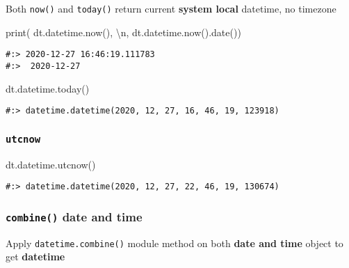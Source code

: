 \documentclass[
]{book}
\newenvironment{Shaded}{\begin{snugshade}}{\end{snugshade}}
\newcommand{\BuiltInTok}[1]{#1}
\newcommand{\CharTok}[1]{\textcolor[rgb]{0.5,0.5,0.5}{#1}}
\newcommand{\NormalTok}[1]{#1}
\newcommand{\StringTok}[1]{\textcolor[rgb]{0.5,0.5,0.5}{#1}}
\begin{document}
Both \texttt{now()} and \texttt{today()} return current \textbf{system local} datetime, no timezone

\begin{Shaded}
\begin{Highlighting}[]
\BuiltInTok{print}\NormalTok{(  dt.datetime.now(), }\StringTok{\textquotesingle{}}\CharTok{\textbackslash{}n}\StringTok{\textquotesingle{}}\NormalTok{,}
\NormalTok{        dt.datetime.now().date())}
\end{Highlighting}
\end{Shaded}

\begin{verbatim}
#:> 2020-12-27 16:46:19.111783 
#:>  2020-12-27
\end{verbatim}

\begin{Shaded}
\begin{Highlighting}[]
\NormalTok{dt.datetime.today()}
\end{Highlighting}
\end{Shaded}

\begin{verbatim}
#:> datetime.datetime(2020, 12, 27, 16, 46, 19, 123918)
\end{verbatim}

\hypertarget{utcnow}{%
\subsubsection{\texorpdfstring{\texttt{utcnow}}{utcnow}}\label{utcnow}}

\begin{Shaded}
\begin{Highlighting}[]
\NormalTok{dt.datetime.utcnow()}
\end{Highlighting}
\end{Shaded}

\begin{verbatim}
#:> datetime.datetime(2020, 12, 27, 22, 46, 19, 130674)
\end{verbatim}

\hypertarget{combine-date-and-time}{%
\subsubsection{\texorpdfstring{\texttt{combine()} date and time}{combine() date and time}}\label{combine-date-and-time}}

Apply \texttt{datetime.combine()} module method on both \textbf{date and time} object to get \textbf{datetime}
\end{document}
